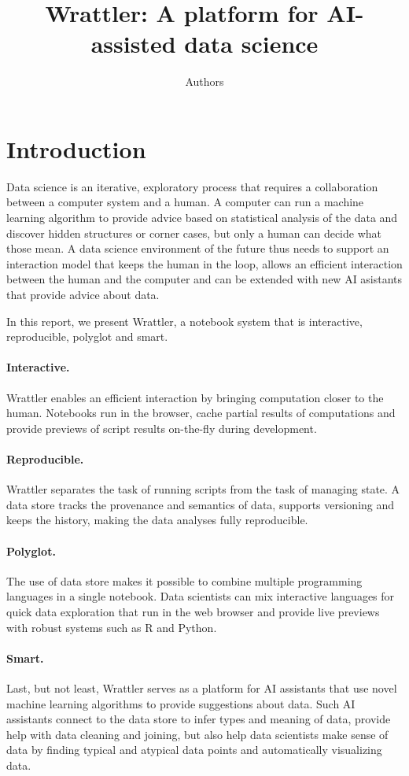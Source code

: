 \documentclass[sigplan,preprint,10pt]{acmart}\settopmatter{printfolios=true,printccs=false,printacmref=false}
\title{Wrattler: \textnormal{A platform for AI-assisted data science}}
\author{Authors}
\theoremstyle{plain}
\theoremstyle{definition}
\begin{document}
\maketitle

\section{Introduction}
Data science is an iterative, exploratory process that requires a collaboration between a 
computer system and a human. A computer can run a machine learning algorithm to provide advice 
based on statistical analysis of the data and discover hidden structures or corner cases, but only
a human can decide what those mean.
A data science environment of the future thus needs to support an interaction model that 
keeps the human in the loop, allows an efficient interaction between the human and the computer
and can be extended with new AI asistants that provide advice about data.

In this report, we present Wrattler, a notebook system that is interactive, reproducible, 
polyglot and smart.

\paragraph{Interactive.}
Wrattler enables an efficient interaction by bringing computation closer to the human.
Notebooks run in the browser, cache partial results of computations and provide previews
of script results on-the-fly during development.

\paragraph{Reproducible.} 
Wrattler separates the task of running scripts from the task of managing state.
A data store tracks the provenance and semantics of data, supports versioning and keeps 
the history, making the data analyses fully reproducible.

\paragraph{Polyglot.}
The use of data store makes it possible to combine multiple programming languages in 
a single notebook. Data scientists can mix interactive languages for quick data exploration
that run in the web browser and provide live previews with robust systems such as R and Python.

\paragraph{Smart.}
Last, but not least, Wrattler serves as a platform for AI assistants that use novel
machine learning algorithms to provide suggestions about data. Such AI assistants connect to the
data store to infer types and meaning of data, provide help with data cleaning and joining, but also help data scientists
make sense of data by finding typical and atypical data points and automatically visualizing data.
\end{document}
